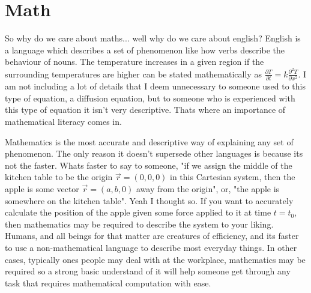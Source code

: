 \documentclass{article}
\begin{document}

\section{Math}

So why do we care about maths... well why do we care about english? English is a language which describes a set of phenomenon like how verbs describe the behaviour of nouns. The temperature increases in a given region if the surrounding temperatures are higher can be stated mathematically as \begin{math} \frac{\partial{T}}{\partial{t}} = k \frac{\partial^{2} T}{\partial{x^{2}}} \end{math}. I am not including a lot of details that I deem unnecessary to someone used to this type of equation, a diffusion equation, but to someone who is experienced with this type of equation it isn't very descriptive. Thats where an importance of mathematical literacy comes in.

Mathematics is the most accurate and descriptive way of explaining any set of phenomenon. The only reason it doesn't supersede other languages is because its not the faster. Whats faster to say to someone, "if we assign the middle of the kitchen table to be the origin \begin{math} \vec{r} = (0, 0, 0) \end{math} in this Cartesian system, then the apple is some vector \begin{math} \vec{r} = (a, b, 0) \end{math} away from the origin", or, "the apple is somewhere on the kitchen table". Yeah I thought so. If you want to accurately calculate the position of the apple given some force applied to it at time \begin{math} t = t_0 \end{math}, then mathematics may be required to describe the system to your liking. Humans, and all beings for that matter are creatures of efficiency, and its faster to use a non-mathematical language to describe most everyday things. In other cases, typically ones people may deal with at the workplace, mathematics may be required so a strong basic understand of it will help someone get through any task that requires mathematical computation with ease. 

\end{document}
